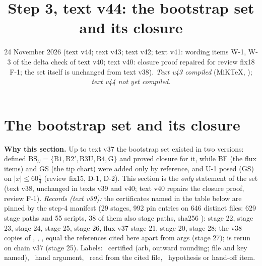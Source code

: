 \documentclass[11pt]{article}
\title{Step 3, text v44: the bootstrap set and its closure}
\author{}\date{24 November 2026 (text v44; text v43; text v42; text v41: wording items W-1, W-3 of the delta check of text v40; text v40: closure proof repaired for review fix18 F-1; the set itself is unchanged from text v38). \emph{Text v43 compiled} (MiKTeX, \fn{fix26_latex_v43/LATEX_v43.md}); \emph{text v44 not yet compiled.}}
\begin{document}
\maketitle
\fi

\section{The bootstrap set and its closure}\label{BS:sec}
\noindent\textbf{Why this section.} Up to text v37 the bootstrap set existed in two versions:  defined $\mathrm{BS}_U=\{\mathrm{B1},\mathrm{B2}',\mathrm{B3U},\mathrm{B4},\mathrm{G}\}$ and proved closure for it, while BF (the flux items) and GS (the tip chart) were added only by reference, and U-1 posed (GS) on $|x|\le60\frac14$ (review fix15, D-1, D-2). This section is the \emph{only} statement of the set (text v38, unchanged in texts v39 and v40; text v40 repairs the closure proof, review  F-1). \emph{Records (text v39):} the certificates named in the table below are pinned by the step-4 manifest  (29 stages, 992 pin entries on 646 distinct files: 629 stage paths and 55 scripts, 38 of them also stage paths, sha256 ):  stage 22,  stage 23,  stage 24,  stage 25,  stage 26, flux v37 stage 21,  stage 20,  stage 28; the v38 copies of , , ,  equal the references cited here apart from args (stage 27);  is rerun on chain v37 (stage 25). Labels: \tC\ certified (arb, outward rounding; file and key named), \tHd\ hand argument, \tR\ read from the cited file, \tH\ hypothesis or hand-off item.
\end{document}
